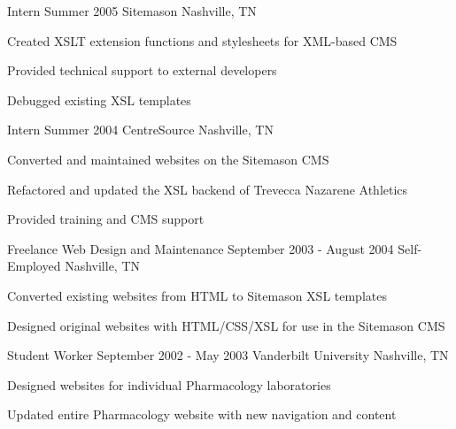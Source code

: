 {\begin{cventries}
  \cventry
  {Intern}
  {Summer 2005}
  {Sitemason}
  {Nashville, TN}
  {
    \begin{cvitems}
      \item Created XSLT extension functions and stylesheets for XML-based CMS
      \item Provided technical support to external developers
      \item Debugged existing XSL templates
    \end{cvitems}
  }

  \cventry
  {Intern}
  {Summer 2004}
  {CentreSource}
  {Nashville, TN}
  {
    \begin{cvitems}
      \item Converted and maintained websites on the Sitemason CMS
      \item Refactored and updated the XSL backend of Trevecca Nazarene Athletics
      \item Provided training and CMS support
    \end{cvitems}
  }

  \cventry
  {Freelance Web Design and Maintenance}
  {September 2003 - August 2004}
  {Self-Employed}
  {Nashville, TN}
  {
    \begin{cvitems}
      \item Converted existing websites from HTML to Sitemason XSL templates
      \item Designed original websites with HTML/CSS/XSL for use in the Sitemason CMS
    \end{cvitems}
  }

  \cventry
  {Student Worker}
  {September 2002 - May 2003}
  {Vanderbilt University}
  {Nashville, TN}
  {
    \begin{cvitems}
      \item Designed websites for individual Pharmacology laboratories
      \item Updated entire Pharmacology website with new navigation and content
    \end{cvitems}
  }

\end{cventries}
}{}
